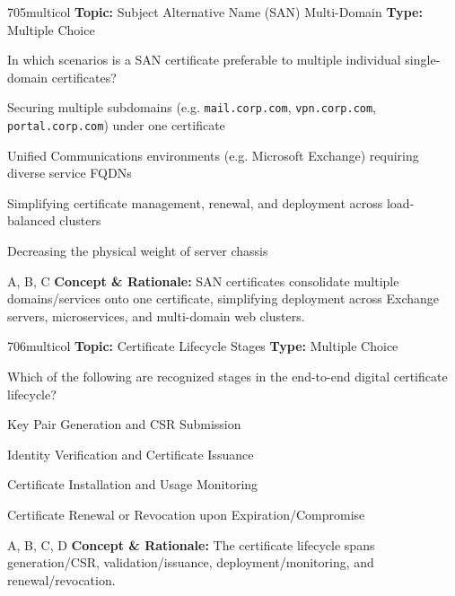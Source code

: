 \begin{qcard}{705}{multicol}
\textcolor{darkslate!75}{\small\textbf{Topic:} Subject Alternative Name (SAN) Multi-Domain \hfill \textbf{Type:} Multiple Choice}\vspace{0.4em}\par
In which scenarios is a SAN certificate preferable to multiple individual single-domain certificates?
\begin{qoptions}
\item Securing multiple subdomains (e.g. \texttt{mail.corp.com}, \texttt{vpn.corp.com}, \texttt{portal.corp.com}) under one certificate
\item Unified Communications environments (e.g. Microsoft Exchange) requiring diverse service FQDNs
\item Simplifying certificate management, renewal, and deployment across load-balanced clusters
\item Decreasing the physical weight of server chassis
\end{qoptions}
\end{qcard}
\nopagebreak
\begin{explainbox}{A, B, C}
\textbf{Concept \& Rationale:} SAN certificates consolidate multiple domains/services onto one certificate, simplifying deployment across Exchange servers, microservices, and multi-domain web clusters.
\end{explainbox}

\begin{qcard}{706}{multicol}
\textcolor{darkslate!75}{\small\textbf{Topic:} Certificate Lifecycle Stages \hfill \textbf{Type:} Multiple Choice}\vspace{0.4em}\par
Which of the following are recognized stages in the end-to-end digital certificate lifecycle?
\begin{qoptions}
\item Key Pair Generation and CSR Submission
\item Identity Verification and Certificate Issuance
\item Certificate Installation and Usage Monitoring
\item Certificate Renewal or Revocation upon Expiration/Compromise
\end{qoptions}
\end{qcard}
\nopagebreak
\begin{explainbox}{A, B, C, D}
\textbf{Concept \& Rationale:} The certificate lifecycle spans generation/CSR, validation/issuance, deployment/monitoring, and renewal/revocation.
\end{explainbox}

